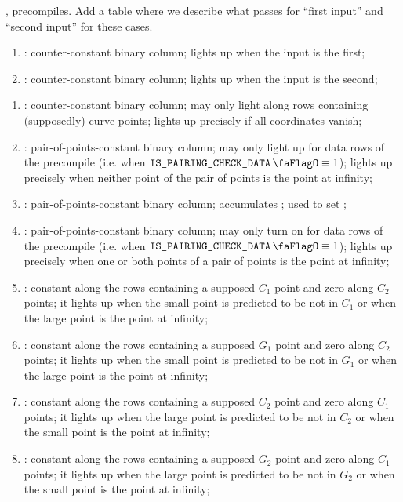 ,
precompiles.
\specTodo{} Add a table where we describe what passes for ``first input'' and ``second input'' for these cases.
\begin{enumerate}[resume]
    \item
        \isFirstInput:
        counter-constant binary column;
        lights up when the input is the first;
    \item
        \isSecondInput:
        counter-constant binary column;
        lights up when the input is the second;
\end{enumerate}
\begin{enumerate}[resume]
    \item
        \isInfinity:
        counter-constant binary column;
        may only light along rows containing (supposedly) curve points;
        lights up precisely if all coordinates vanish;
    \item
        \nontrivialPairOfPoints:
        pair-of-points-constant binary column;
        may only light up for data rows of the  precompile (i.e. when $\isBlsPairingCheckData \equiv 1$);
        lights up precisely when neither point of the pair of points is the point at infinity;
    \item
        \nontrivialPairOfPointsAcc:
        pair-of-points-constant binary column;
        accumulates \nontrivialPairOfPoints{};
        used to set \wellformedDataNontrivial{};
    \item
        \specTodo{}
        \deprecated{}
        \both{\nontrivialPairOfPoints}:
        pair-of-points-constant binary column;
        may only turn on for data rows of the  precompile (i.e. when $\isBlsPairingCheckData \equiv 1$);
        lights up precisely when one or both points of a pair of points is the point at infinity;
    \item
        \both{\cOneMembershipTestRequired}:
        constant along the rows containing a supposed $C_1$ point and zero along $C_2$ points;
        it lights up when the small point is predicted to be not in $C_1$ or when the large point is the point at infinity;
    \item
        \both{\gOneMembershipTestRequired}:
        constant along the rows containing a supposed $G_1$ point and zero along $C_2$ points;
        it lights up when the small point is predicted to be not in $G_1$ or when the large point is the point at infinity;
    \item
        \both{\cTwoMembershipTestRequired}:
        constant along the rows containing a supposed $C_2$ point and zero along $C_1$ points;
        it lights up when the large point is predicted to be not in $C_2$ or when the small point is the point at infinity;
    \item
        \both{\gTwoMembershipTestRequired}:
        constant along the rows containing a supposed $G_2$ point and zero along $C_1$ points;
        it lights up when the large point is predicted to be not in $G_2$ or when the small point is the point at infinity;
\end{enumerate}
